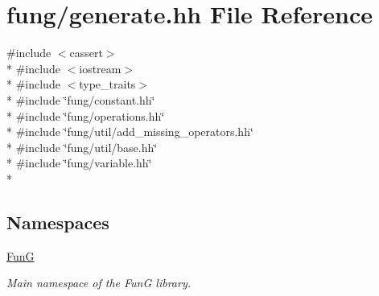 \hypertarget{generate_8hh}{}\section{fung/generate.hh File Reference}
\label{generate_8hh}
{\ttfamily \#include $<$cassert$>$}\\*
{\ttfamily \#include $<$iostream$>$}\\*
{\ttfamily \#include $<$type\+\_\+traits$>$}\\*
{\ttfamily \#include \char`\"{}fung/constant.\+hh\char`\"{}}\\*
{\ttfamily \#include \char`\"{}fung/operations.\+hh\char`\"{}}\\*
{\ttfamily \#include \char`\"{}fung/util/add\+\_\+missing\+\_\+operators.\+hh\char`\"{}}\\*
{\ttfamily \#include \char`\"{}fung/util/base.\+hh\char`\"{}}\\*
{\ttfamily \#include \char`\"{}fung/variable.\+hh\char`\"{}}\\*
\subsection*{Namespaces}
\begin{DoxyCompactItemize}
\item 
 \hyperlink{namespaceFunG}{Fun\+G}
\begin{DoxyCompactList}\small\item\em Main namespace of the Fun\+G library. \end{DoxyCompactList}\end{DoxyCompactItemize}
